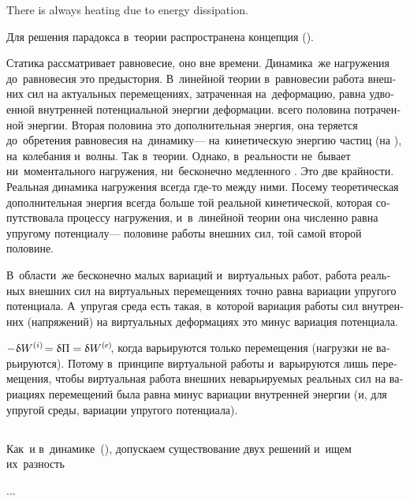 \begin{otherlanguage}{russian}
There is always heating due to energy dissipation.

Для решения парадокса в~теории распространена концепция  ().

{\small
Статика рассматривает  равновесие, оно вне времени. Динамика~же нагружения до~равновесия это предыстория. В~линейной теории в~равновесии работа внешних сил на актуальных перемещениях, затраченная на~деформацию, равна удвоенной внутренней потенциальной энергии деформации.  всего половина потраченной энергии. Вторая половина это дополнительная энергия, она теряется до~обретения равновесия на~динамику\:--- на~кинетическую энергию частиц (на ), на~колебания и~волны. Так в~теории. Однако, в~реальности не~бывает ни~моментального  нагружения, ни~бесконечно медленного . Это две крайности. Реальная динамика нагружения всегда где\hbox{-}то между ними. Посему теоретическая дополнительная энергия всегда больше той реальной  кинетической, которая сопутствовала процессу нагружения, и~в~линейной теории она численно равна упругому потенциалу\:--- половине работы внешних сил, той самой второй половине.

В~области~же бесконечно малых вариаций и~виртуальных работ, работа реальных внешних сил на виртуальных перемещениях точно равна вариации упругого потенциала. А~упругая среда есть такая, в~которой вариация работы сил внутренних (напряжений) на виртуальных деформациях это минус вариация потенциала.

${- \hspace{.1ex} \variation{\internalwork} \hspace{-0.2ex} = \variation{\Pi} = \variation{\externalwork} \hspace{-0.25ex}}$, когда варьируются только перемещения (нагрузки не варьируются). Потому в~принципе виртуальной работы и~варьируются лишь перемещения, чтобы виртуальная работа внешних неварьируемых реальных сил на вариациях перемещений была равна минус вариации внутренней энергии (и, для упругой среды, вариации упругого потенциала).
\par}

\subsection*{}

Как~и в~динамике~(), допускаем существование двух решений и~ищем их~разность

...

\end{otherlanguage}

